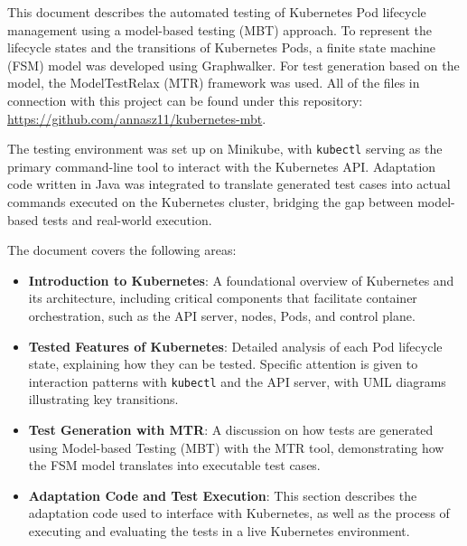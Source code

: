 \documentclass[main.tex]{subfiles}
\begin{document}
This document describes the automated testing of Kubernetes Pod lifecycle management using a model-based testing (MBT) approach. To represent the lifecycle states and the transitions of Kubernetes Pods, a finite state machine (FSM) model was developed using Graphwalker. For test generation based on the model, the ModelTestRelax (MTR) framework was used. All of the files in connection with this project can be found under this repository: \url{https://github.com/annasz11/kubernetes-mbt}. 

The testing environment was set up on Minikube, with \texttt{kubectl} serving as the primary command-line tool to interact with the Kubernetes API. Adaptation code written in Java was integrated to translate generated test cases into actual commands executed on the Kubernetes cluster, bridging the gap between model-based tests and real-world execution.

The document covers the following areas:
\begin{itemize}
    \item \textbf{Introduction to Kubernetes}: A foundational overview of Kubernetes and its architecture, including critical components that facilitate container orchestration, such as the API server, nodes, Pods, and control plane.
    \item \textbf{Tested Features of Kubernetes}: Detailed analysis of each Pod lifecycle state, explaining how they can be tested. Specific attention is given to interaction patterns with \texttt{kubectl} and the API server, with UML diagrams illustrating key transitions.
    \item \textbf{Test Generation with MTR}: A discussion on how tests are generated using Model-based Testing (MBT) with the MTR tool, demonstrating how the FSM model translates into executable test cases.
    \item \textbf{Adaptation Code and Test Execution}: This section describes the adaptation code used to interface with Kubernetes, as well as the process of executing and evaluating the tests in a live Kubernetes environment.
\end{itemize}
\end{document}
